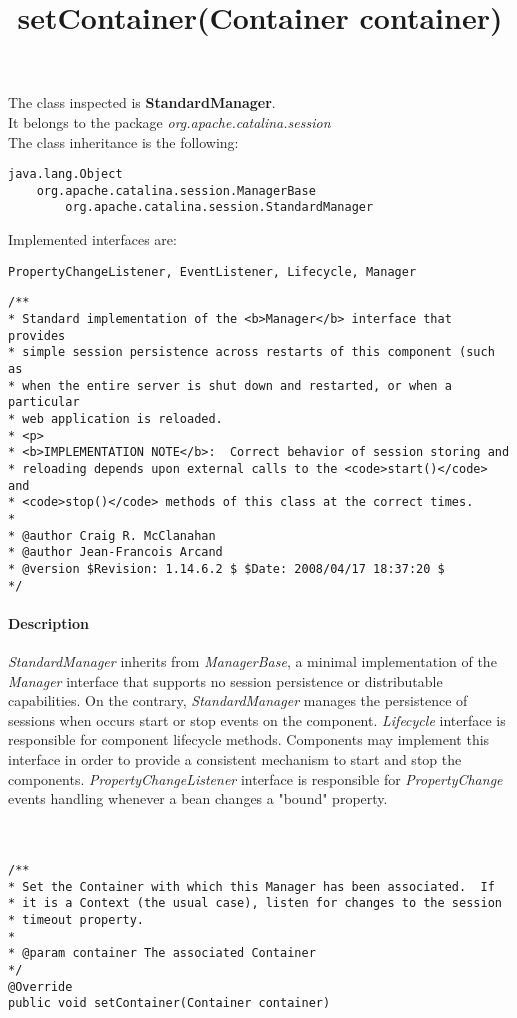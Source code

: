 The class inspected is \textbf{StandardManager}.\\It belongs to the package \textit{org.apache.catalina.session}\\
The class inheritance is the following:
\begin{verbatim}
java.lang.Object
    org.apache.catalina.session.ManagerBase
        org.apache.catalina.session.StandardManager
\end{verbatim}

Implemented interfaces are:
\begin{verbatim}
PropertyChangeListener, EventListener, Lifecycle, Manager
\end{verbatim}
\lstset{firstnumber=79}
\begin{lstlisting}
/**
* Standard implementation of the <b>Manager</b> interface that provides
* simple session persistence across restarts of this component (such as
* when the entire server is shut down and restarted, or when a particular
* web application is reloaded.
* <p>
* <b>IMPLEMENTATION NOTE</b>:  Correct behavior of session storing and
* reloading depends upon external calls to the <code>start()</code> and
* <code>stop()</code> methods of this class at the correct times.
*
* @author Craig R. McClanahan
* @author Jean-Francois Arcand
* @version $Revision: 1.14.6.2 $ $Date: 2008/04/17 18:37:20 $
*/
\end{lstlisting}
\paragraph{Description} \textit{StandardManager} inherits from \textit{ManagerBase}, a minimal implementation of the \textit{Manager} interface that supports no session persistence or distributable capabilities. On the contrary, \textit{StandardManager} manages the persistence of sessions when occurs start or stop events on the component. \textit{Lifecycle} interface is responsible for component lifecycle methods. Components may implement this interface in order to provide a consistent mechanism to start and stop the components. \textit{PropertyChangeListener} interface is responsible for \textit{PropertyChange} events handling whenever a bean changes a "bound" property.\\\\\\



\title{{\large \textbf{setContainer(Container container)}}}
\lstset{firstnumber=245}
\begin{lstlisting}
/**
* Set the Container with which this Manager has been associated.  If
* it is a Context (the usual case), listen for changes to the session
* timeout property.
*
* @param container The associated Container
*/
@Override
public void setContainer(Container container)
\end{lstlisting}

